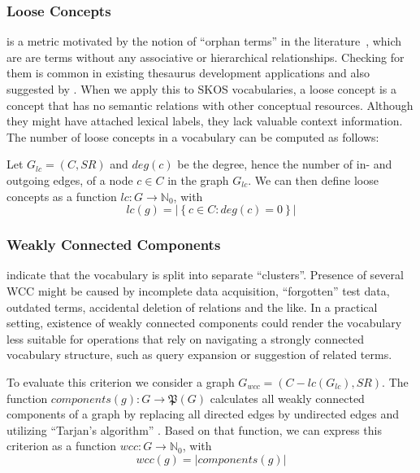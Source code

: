 \subsubsection{Loose Concepts} is a metric motivated by the notion of ``orphan terms'' in the literature~\cite{Hedden2010}, which are are terms without any associative or hierarchical relationships. Checking for them is common in existing thesaurus development applications and also suggested by \cite{Z39.19:2005}. When we apply this to SKOS vocabularies, a loose concept is a concept that has no semantic relations with other conceptual resources. Although they might have attached lexical labels, they lack valuable context information. The number of loose concepts in a vocabulary can be computed as follows:

\begin{definition}
Let \(G_{lc} = (C, SR)\) and \(deg(c)\) be the degree, hence the number of in- and outgoing edges, of a node $c \in C$ in the graph $G_{lc}$. We can then define loose concepts as a function \(lc : G \rightarrow \mathbb{N}_{0}\), with \[lc(g) = \left|\left\{c \in C : deg(c) = 0\right\}\right|\] 

\end{definition}

\subsubsection{Weakly Connected Components} indicate that the vocabulary is split into separate ``clusters''. Presence of several WCC might be caused by incomplete data acquisition, ``forgotten'' test data, outdated terms, accidental deletion of relations and the like. In a practical setting, existence of weakly connected components could render the vocabulary less suitable for operations that rely on navigating a strongly connected vocabulary structure, such as query expansion or suggestion of related terms.
 
\begin{definition}
To evaluate this criterion we consider a graph \(G_{wcc} = (C - lc(G_{lc}), SR)\). The function \(components(g) : G \rightarrow  \mathfrak{P}(G)\) calculates all weakly connected components of a graph by replacing all directed edges by undirected edges and utilizing “Tarjan’s algorithm” \cite{Hopcroft1973}. Based on that function, we can express this criterion as a function \(wcc : G \rightarrow \mathbb{N}_{0}\), with \[wcc(g) = \left|components(g)\right|\]
\end{definition}
 
